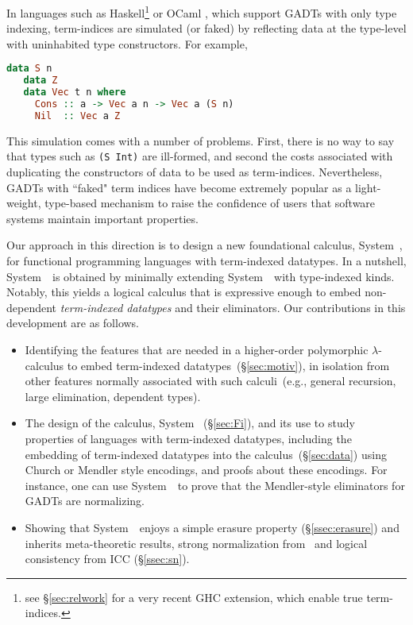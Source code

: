 In languages such as Haskell\footnote{see \S\ref{sec:relwork} for
        a very recent GHC extension, which enable true term-indices.}
        or OCaml \cite{GarNor11}, which support GADTs with only type indexing,
term-indices are simulated (or faked) by reflecting data at the type-level
with uninhabited type constructors. For example,\vspace*{-2pt}
\begin{lstlisting}[basicstyle={\ttfamily\small},language=Haskell,mathescape]
   data S n
   data Z
   data Vec t n where
     Cons :: a -> Vec a n -> Vec a (S n)
     Nil  :: Vec a Z
\end{lstlisting}\vspace*{-2pt}
This simulation comes with a number of problems. First, there is no way to say
that types such as {\tt (S Int)} are ill-formed, and second the costs
associated with duplicating the constructors of data to be used
as term-indices.
Nevertheless, GADTs with ``faked" term indices have become extremely popular
as a light-weight, type-based mechanism to raise the confidence of users
that software systems maintain important properties.

Our approach in this direction is to design a new foundational calculus,
System~\Fi, for functional programming languages with term-indexed
datatypes.  In a nutshell, System~\Fi\ is obtained by minimally extending
System~\Fw\ with type-indexed kinds.  Notably, this yields a logical
calculus that is expressive enough to embed non-dependent
\emph{term-indexed datatypes} and their eliminators. Our contributions in
this development are as follows.\vspace*{-.8ex}
\begin{itemize}
\item 
  Identifying the features that are needed in a higher-order polymorphic
  $\lambda$-calculus to embed term-indexed datatypes~(\S\ref{sec:motiv}),
  in isolation from other features normally associated with such
  calculi~(e.g., general recursion, large elimination, dependent types).
\item 
  The design of the calculus, System \Fi\ (\S\ref{sec:Fi}), and its use to
  study properties of languages with term-indexed datatypes, including
  the embedding of
  term-indexed datatypes into the calculus~(\S\ref{sec:data}) using
  Church or Mendler style encodings, and  proofs about these encodings.
  For instance, one can use System~\Fi\ to prove that
  the Mendler-style eliminators for GADTs
  \cite{AhnShe11} are normalizing.
\item 
  Showing that System~\Fi\ enjoys a simple erasure
  property (\S\ref{ssec:erasure}) 
  and inherits meta-theoretic
  results, strong normalization from \Fw\  and logical consistency from
  ICC (\S\ref{ssec:sn}).
\end{itemize}\vspace*{-3pt}

